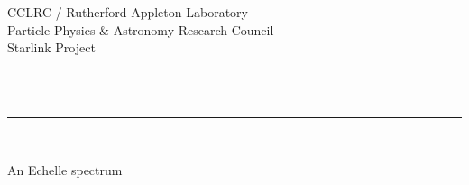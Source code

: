 \begin{latexonly}
   CCLRC / {\sc Rutherford Appleton Laboratory} \hfill {\bf \stardocname}\\
   {\large Particle Physics \& Astronomy Research Council}\\
   {\large Starlink Project\\}
   {\large \stardoccategory\ \stardocnumber}
   \begin{flushright}
   \stardocauthors\\
   \stardocdate
   \end{flushright}
   \vspace{-4mm}
   \rule{\textwidth}{0.5mm}
   \vspace{5mm}
   \begin{center}
   {\Huge\bf  \stardoctitle \\ [2.5ex]}
   \end{center}
   \vspace{5mm}

   \begin{center}
   \leavevmode\epsfysize=120mm

   An Echelle spectrum
   \end{center}

\end{latexonly}

